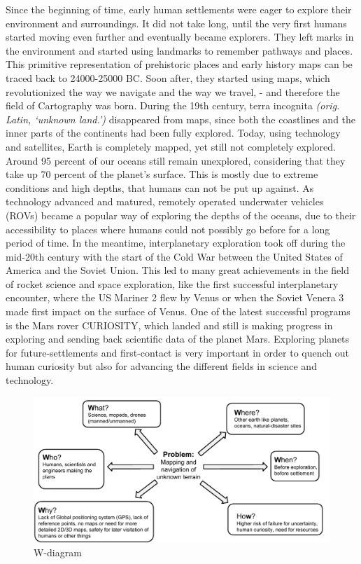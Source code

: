 Since the beginning of time, early human settlements were eager to explore their environment and surroundings. It did not take long, until the very first humans started moving even further and eventually became explorers. They left marks in the environment and started using landmarks to remember pathways and places. This primitive representation of prehistoric places and early history maps can be traced back to 24000-25000 BC\cite{cavedrawings}. Soon after, they started using maps, which revolutionized the way we navigate and the way we travel, - and therefore the field of Cartography was born. During the 19th century, terra incognita \textit{(orig. Latin, ‘unknown land.’)} disappeared from maps, since both the coastlines and the inner parts of the continents had been fully explored. Today, using technology and satellites, Earth is completely mapped\cite{earth-mapped}, yet still not completely explored\cite{earth-explored}. Around 95 percent of our oceans still remain unexplored, considering that they take up 70 percent of the planet's surface\cite{oceandepth}. This is mostly due to extreme conditions and high depths, that humans can not be put up against. As technology advanced and matured, remotely operated underwater vehicles (ROVs) became a popular way of exploring the depths of the oceans, due to their accessibility to places where humans could not possibly go before for a long period of time. In the meantime, interplanetary exploration took off during the mid-20th century with the start of the Cold War between the United States of America and the Soviet Union. This led to many great achievements in the field of rocket science and space exploration, like the first successful interplanetary encounter, where the US Mariner 2 flew by Venus\cite{firstflyby} or when the Soviet Venera 3 made first impact on the surface of Venus\cite{firstimpact}. One of the latest successful programs is the Mars rover CURIOSITY\cite{curiosity}, which landed and still is making progress in exploring and sending back scientific data of the planet Mars. Exploring planets for future-settlements and first-contact is very important in order to quench out human curiosity but also for advancing the different fields in science and technology.

\clearpage

\begin{figure}[!h]
	\centering
	\includegraphics[scale=.7]{images/wdiagram2.pdf}
	\caption{W-diagram}
	\label{fig:wdiagram}
\end{figure}

